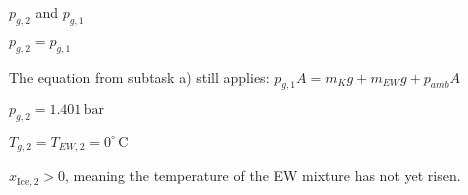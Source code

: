 \( p_{g,2} \) and \( p_{g,1} \)  

\( p_{g,2} = p_{g,1} \)  

The equation from subtask a) still applies:  
\( p_{g,1} A = m_K g + m_{EW} g + p_{amb} A \)  

\( p_{g,2} = 1.401 \, \text{bar} \)  

\( T_{g,2} = T_{EW,2} = 0^\circ \, \text{C} \)  

\( x_{\text{Ice},2} > 0 \), meaning the temperature of the EW mixture has not yet risen.